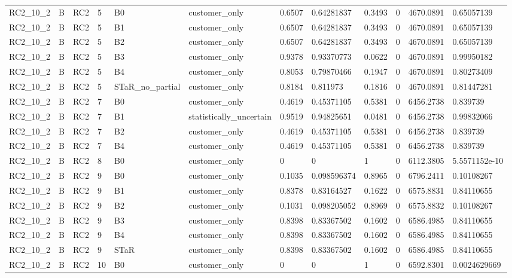 \begin{longtable}{llllllllllll}
RC2\_10\_2 & B & RC2 & 5 & B0 & customer\_only & 0.6507 & 0.64281837 & 0.3493 & 0 & 4670.0891 & 0.65057139 \\
RC2\_10\_2 & B & RC2 & 5 & B1 & customer\_only & 0.6507 & 0.64281837 & 0.3493 & 0 & 4670.0891 & 0.65057139 \\
RC2\_10\_2 & B & RC2 & 5 & B2 & customer\_only & 0.6507 & 0.64281837 & 0.3493 & 0 & 4670.0891 & 0.65057139 \\
RC2\_10\_2 & B & RC2 & 5 & B3 & customer\_only & 0.9378 & 0.93370773 & 0.0622 & 0 & 4670.0891 & 0.99950182 \\
RC2\_10\_2 & B & RC2 & 5 & B4 & customer\_only & 0.8053 & 0.79870466 & 0.1947 & 0 & 4670.0891 & 0.80273409 \\
RC2\_10\_2 & B & RC2 & 5 & STaR\_no\_partial & customer\_only & 0.8184 & 0.811973 & 0.1816 & 0 & 4670.0891 & 0.81447281 \\
RC2\_10\_2 & B & RC2 & 7 & B0 & customer\_only & 0.4619 & 0.45371105 & 0.5381 & 0 & 6456.2738 & 0.839739 \\
RC2\_10\_2 & B & RC2 & 7 & B1 & statistically\_uncertain & 0.9519 & 0.94825651 & 0.0481 & 0 & 6456.2738 & 0.99832066 \\
RC2\_10\_2 & B & RC2 & 7 & B2 & customer\_only & 0.4619 & 0.45371105 & 0.5381 & 0 & 6456.2738 & 0.839739 \\
RC2\_10\_2 & B & RC2 & 7 & B4 & customer\_only & 0.4619 & 0.45371105 & 0.5381 & 0 & 6456.2738 & 0.839739 \\
RC2\_10\_2 & B & RC2 & 8 & B0 & customer\_only & 0 & 0 & 1 & 0 & 6112.3805 & 5.5571152e-10 \\
RC2\_10\_2 & B & RC2 & 9 & B0 & customer\_only & 0.1035 & 0.098596374 & 0.8965 & 0 & 6796.2411 & 0.10108267 \\
RC2\_10\_2 & B & RC2 & 9 & B1 & customer\_only & 0.8378 & 0.83164527 & 0.1622 & 0 & 6575.8831 & 0.84110655 \\
RC2\_10\_2 & B & RC2 & 9 & B2 & customer\_only & 0.1031 & 0.098205052 & 0.8969 & 0 & 6575.8832 & 0.10108267 \\
RC2\_10\_2 & B & RC2 & 9 & B3 & customer\_only & 0.8398 & 0.83367502 & 0.1602 & 0 & 6586.4985 & 0.84110655 \\
RC2\_10\_2 & B & RC2 & 9 & B4 & customer\_only & 0.8398 & 0.83367502 & 0.1602 & 0 & 6586.4985 & 0.84110655 \\
RC2\_10\_2 & B & RC2 & 9 & STaR & customer\_only & 0.8398 & 0.83367502 & 0.1602 & 0 & 6586.4985 & 0.84110655 \\
RC2\_10\_2 & B & RC2 & 10 & B0 & customer\_only & 0 & 0 & 1 & 0 & 6592.8301 & 0.0024629669 \\

\end{longtable}
